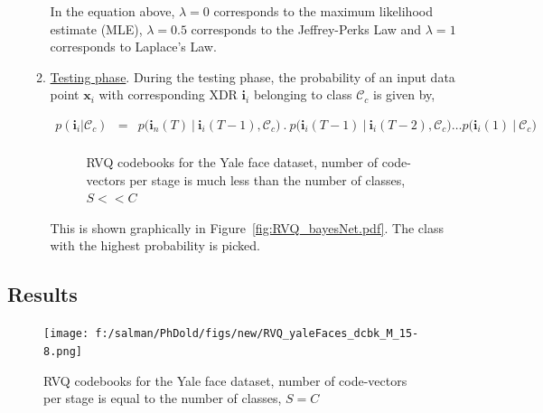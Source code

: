 \begin{Body}
\begin{enumerate}
\begin{enumerate}
In the equation above, $\lambda=0$ corresponds to the maximum likelihood estimate (MLE), $\lambda=0.5$ corresponds to the Jeffrey-Perks Law and $\lambda=1$ corresponds to Laplace's Law.
\item \underline{Testing phase}.  During the testing phase, the probability of an input data point $\mathbf{x}_i$ with corresponding XDR $\mathbf{i}_i$ belonging to class $\mathcal{C}_c$ is given by,

\begin{equation}
\begin{array}{llllll}
p (\mathbf{i}_i|\mathcal{C}_c) &=& p \bigg (\mathbf{i}_n(T) \ | \ \mathbf{i}_i(T-1), \mathcal{C}_c \bigg) \ . \ 
p \bigg(\mathbf{i}_i(T-1) \ | \ \mathbf{i}_i(T-2), \mathcal{C}_c \bigg) \ldots  
p \bigg (\mathbf{i}_i(1) \ | \ \mathcal{C}_c \bigg ) \\
\end{array}
\end{equation}
									\begin{figure}[t]
									\centering
									\caption{RVQ codebooks for the Yale face dataset, number of code-vectors per stage is much less than the number of classes, $S << C$}
									\label{fig:RVQ_codebooks_smallS_Yale}	
									\end{figure}



This is shown graphically in Figure~\ref{fig:RVQ_bayesNet.pdf}.  The class with the highest probability is picked.
\end{enumerate}
\end{enumerate}

\subsection{Results}
									\begin{figure}[t]
									\centering
									\texttt{[image: f:/salman/PhDold/figs/new/RVQ\_yaleFaces\_dcbk\_M\_15-8.png]}
									\caption{RVQ codebooks for the Yale face dataset, number of code-vectors per stage is equal to the number of classes, $S=C$}
									\label{fig:RVQ_codebooks_largeS_Yale}	
									\end{figure}


\end{Body}
